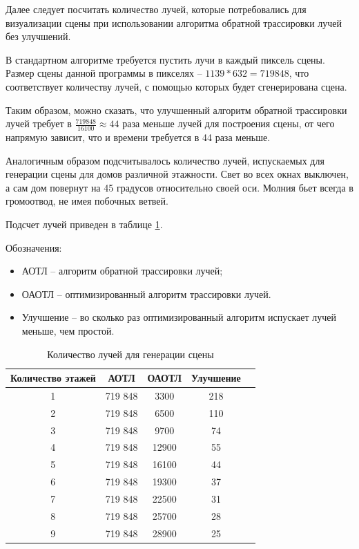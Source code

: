 Далее следует посчитать количество лучей, которые потребовались для визуализации сцены при использовании алгоритма обратной трассировки лучей без улучшений. 

В стандартном алгоритме требуется пустить лучи в каждый пиксель сцены. Размер сцены данной программы в пикселях -- $1139 * 632 = 719 848$, что соответствует количеству лучей, с помощью которых будет сгенерирована сцена.

Таким образом, можно сказать, что улучшенный алгоритм обратной трассировки лучей требует в $\frac{719 848}{16100} \approx 44$ раза меньше лучей для построения сцены, от чего напрямую зависит, что и времени требуется в 44 раза меньше. 

Аналогичным образом подсчитывалось количество лучей, испускаемых для генерации сцены для домов различной этажности. Свет во всех окнах выключен, а сам дом повернут на 45 градусов относительно своей оси. Молния бьет всегда в громоотвод, не имея побочных ветвей.

Подсчет лучей приведен в таблице \ref{tab:time1}.

Обозначения:
\begin{itemize}
	\item АОТЛ -- алгоритм обратной трассировки лучей;
	\item ОАОТЛ -- оптимизированный алгоритм трассировки лучей.
	\item Улучшение -- во сколько раз оптимизированный алгоритм испускает лучей меньше, чем простой.
\end{itemize}

\begin{table}[h]
	\begin{center}
		\caption{\label{tab:time1}Количество лучей для генерации сцены}
		\begin{tabular}{|c|c|c|c|c|}
			\hline
			Количество этажей & АОТЛ &  ОАОТЛ & Улучшение \\
			\hline
			1  & 719 848 & 3300 & 218 \\
			\hline
			2  & 719 848 & 6500 & 110 \\
			\hline
			3  & 719 848 & 9700 & 74 \\
			\hline
			4  & 719 848 & 12900 & 55 \\
			\hline
			5  & 719 848 & 16100 & 44 \\
			\hline
			6  & 719 848 & 19300 & 37 \\
			\hline
			7  & 719 848 & 22500 & 31 \\
			\hline
			8  & 719 848 & 25700 &  28 \\
			\hline
			9  & 719 848 & 28900 & 25 \\
			\hline
			
		\end{tabular}
	\end{center}
\end{table}


